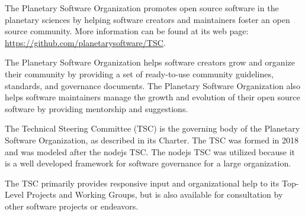 \documentclass[twoside]{article}
\begin{document}


%

%


The Planetary Software Organization promotes open source software
in the planetary sciences by helping software creators and maintainers
foster an open source community.  More information can be found at
its web page: \url{https://github.com/planetarysoftware/TSC}.


The Planetary Software Organization helps software creators grow
and organize their community by providing a set of ready-to-use
community guidelines, standards, and governance documents. The
Planetary Software Organization also helps software maintainers
manage the growth and evolution of their open source software by
providing mentorship and suggestions.

The Technical Steering Committee (TSC) is the governing body of the
Planetary Software Organization, as described in its Charter. The TSC
was formed in 2018 and was modeled after the nodejs TSC. The nodejs
TSC was utilized because it is a well developed framework for 
software governance for a large organization. 

The TSC primarily provides responsive input and organizational help
to its Top-Level Projects and Working Groups, but is also available
for consultation by other software projects or endeavors.
\end{document}
